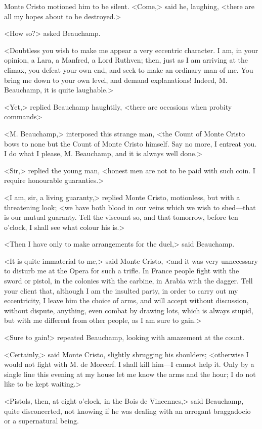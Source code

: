  Monte Cristo motioned him to be silent. <Come,> said he, laughing, <there are all my hopes about to be destroyed.> 

 <How so?> asked Beauchamp. 

 <Doubtless you wish to make me appear a very eccentric character. I am, in your opinion, a Lara, a Manfred, a Lord Ruthven; then, just as I am arriving at the climax, you defeat your own end, and seek to make an ordinary man of me. You bring me down to your own level, and demand explanations! Indeed, M. Beauchamp, it is quite laughable.> 

 <Yet,> replied Beauchamp haughtily, <there are occasions when probity commands\longdash> 

 <M. Beauchamp,> interposed this strange man, <the Count of Monte Cristo bows to none but the Count of Monte Cristo himself. Say no more, I entreat you. I do what I please, M. Beauchamp, and it is always well done.> 

 <Sir,> replied the young man, <honest men are not to be paid with such coin. I require honourable guaranties.> 

 <I am, sir, a living guaranty,> replied Monte Cristo, motionless, but with a threatening look; <we have both blood in our veins which we wish to shed—that is our mutual guaranty. Tell the viscount so, and that tomorrow, before ten o'clock, I shall see what colour his is.> 

 <Then I have only to make arrangements for the duel,> said Beauchamp. 

 <It is quite immaterial to me,> said Monte Cristo, <and it was very unnecessary to disturb me at the Opera for such a trifle. In France people fight with the sword or pistol, in the colonies with the carbine, in Arabia with the dagger. Tell your client that, although I am the insulted party, in order to carry out my eccentricity, I leave him the choice of arms, and will accept without discussion, without dispute, anything, even combat by drawing lots, which is always stupid, but with me different from other people, as I am sure to gain.> 

 <Sure to gain!> repeated Beauchamp, looking with amazement at the count. 

 <Certainly,> said Monte Cristo, slightly shrugging his shoulders; <otherwise I would not fight with M. de Morcerf. I shall kill him—I cannot help it. Only by a single line this evening at my house let me know the arms and the hour; I do not like to be kept waiting.> 

 <Pistols, then, at eight o'clock, in the Bois de Vincennes,> said Beauchamp, quite disconcerted, not knowing if he was dealing with an arrogant braggadocio or a supernatural being. 


